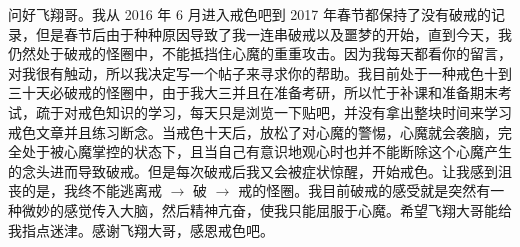 \begin{case}
    问好飞翔哥。我从 2016 年 6 月进入戒色吧到 2017 年春节都保持了没有破戒的记录，但是春节后由于种种原因导致了我一连串破戒以及噩梦的开始，直到今天，我仍然处于破戒的怪圈中，不能抵挡住心魔的重重攻击。因为我每天都看你的留言，对我很有触动，所以我决定写一个帖子来寻求你的帮助。我目前处于一种戒色十到三十天必破戒的怪圈中，由于我大三并且在准备考研，所以忙于补课和准备期末考试，疏于对戒色知识的学习，每天只是浏览一下贴吧，并没有拿出整块时间来学习戒色文章并且练习断念。当戒色十天后，放松了对心魔的警惕，心魔就会袭脑，完全处于被心魔掌控的状态下，且当自己有意识地观心时也并不能断除这个心魔产生的念头进而导致破戒。但是每次破戒后我又会被症状惊醒，开始戒色。让我感到沮丧的是，我终不能逃离戒 $\to$ 破 $\to$  戒的怪圈。我目前破戒的感受就是突然有一种微妙的感觉传入大脑，然后精神亢奋，使我只能屈服于心魔。希望飞翔大哥能给我指点迷津。感谢飞翔大哥，感恩戒色吧。


\end{case}
